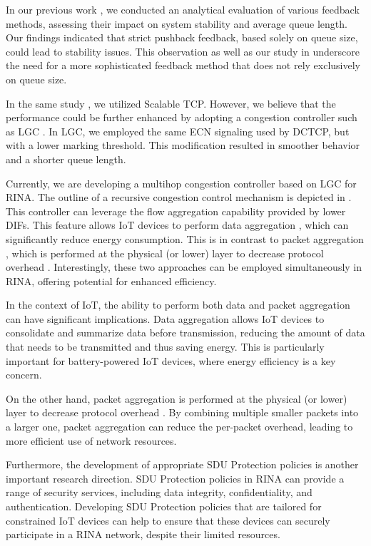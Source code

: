 \documentclass{ieeeaccess}
\begin{document}
In our previous work \cite{hayes2016feedback}, we conducted an analytical evaluation of various feedback methods, assessing their impact on system stability and average queue length. Our findings indicated that strict pushback feedback, based solely on queue size, could lead to stability issues. This observation as well as our study in \cite{welzl2022future} underscore the need for a more sophisticated feedback method that does not rely exclusively on queue size.

In the same study \cite{hayes2016feedback}, we utilized Scalable TCP. However, we believe that the performance could be further enhanced by adopting a congestion controller such as LGC \cite{teymoori2016even, teymoori2020lgcc, ciko2022lgc}. In LGC, we employed the same ECN signaling used by DCTCP, but with a lower marking threshold. This modification resulted in smoother behavior and a shorter queue length.

Currently, we are developing a multihop congestion controller based on LGC for RINA. The outline of a recursive congestion control mechanism is depicted in \cite{welzl2020follow}. This controller can leverage the flow aggregation capability provided by lower DIFs. This feature allows IoT devices to perform data aggregation \cite{teymoori2012real}, which can significantly reduce energy consumption. This is in contrast to packet aggregation \cite{6478424}, which is performed at the physical (or lower) layer to decrease protocol overhead \cite{5734075}. Interestingly, these two approaches can be employed simultaneously in RINA, offering potential for enhanced efficiency.

In the context of IoT, the ability to perform both data and packet aggregation can have significant implications. Data aggregation \cite{teymoori2012real} allows IoT devices to consolidate and summarize data before transmission, reducing the amount of data that needs to be transmitted and thus saving energy. This is particularly important for battery-powered IoT devices, where energy efficiency is a key concern.

On the other hand, packet aggregation \cite{6478424} is performed at the physical (or lower) layer to decrease protocol overhead \cite{5734075}. By combining multiple smaller packets into a larger one, packet aggregation can reduce the per-packet overhead, leading to more efficient use of network resources.

Furthermore, the development of appropriate SDU Protection policies is another important research direction. SDU Protection policies in RINA can provide a range of security services, including data integrity, confidentiality, and authentication. Developing SDU Protection policies that are tailored for constrained IoT devices can help to ensure that these devices can securely participate in a RINA network, despite their limited resources.
\end{document}
